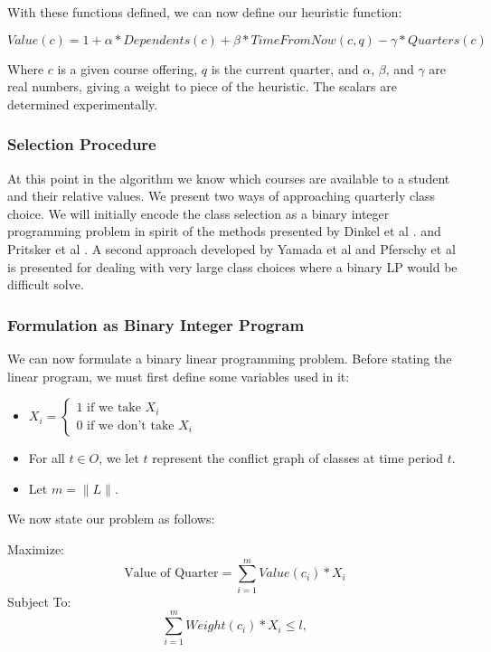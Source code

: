 \documentclass[11pt]{article} %
\begin{document}
With these functions defined, we can now define our heuristic function:

\begin{equation} 
    Value(c) = 1 + \alpha * Dependents(c) + \beta * TimeFromNow(c,q) 
    - \gamma * Quarters(c)
    \label{value_func}
\end{equation} 

Where $c$ is a given course offering, $q$ is the current quarter, and $\alpha$,
$\beta$, and $\gamma$ are real numbers, giving a weight to piece of the
heuristic. The scalars are determined experimentally.  

\subsubsection{Selection Procedure} At this point in the algorithm we know which
courses are available to a student and their relative values. We present two
ways of approaching quarterly class choice.  We will initially encode the class
selection as a binary integer programming problem in spirit of the methods
presented by Dinkel et al \cite{dinkel:scheduling}. and Pritsker et al
\cite{prisker:informs}. A second approach developed by Yamada et al
\cite{yamada:heuristic} and Pferschy et al \cite{pferschy:kcg} is presented for
dealing with very large class choices where a binary LP would be difficult
solve.

\subsubsection{Formulation as Binary Integer Program} We can now formulate
a binary linear programming problem. Before stating the linear
program, we must first define some variables used in it: 

\begin{itemize}
    \item $ X_i = \left\{ \begin{array}{lr} 1 \text{ if we take } X_i\\ 0 \text{ if
we don't take } X_i \end{array} \right. $ 
    \item For all $t \in O$, we let $t$ represent the conflict graph of classes
    at time period $t$.
    \item Let $m = \|L\|$.  
\end{itemize} 
We now state our problem as follows: 

Maximize: 
\begin{equation}
    \text{Value of Quarter} = \sum_{i=1}^m Value(c_i) * X_i
    \label{qtrval}
\end{equation}
Subject To:
\begin{equation}
    \sum_{i=1}^m Weight(c_i) * X_i \leq l, 
    \label{weightlim}
\end{equation}
\end{document}
